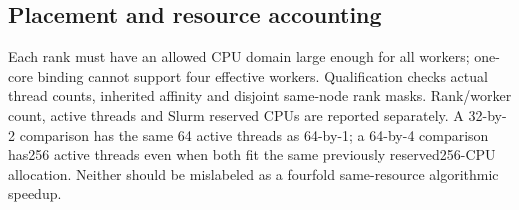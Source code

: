 \subsection{Placement and resource accounting}
Each rank must have an allowed CPU domain large enough for all workers;
one-core binding cannot support four effective workers. Qualification
checks actual thread counts, inherited affinity and disjoint same-node
rank masks. Rank/worker count, active threads and Slurm reserved CPUs are
reported separately. A 32-by-2 comparison has the same 64 active threads as
64-by-1; a 64-by-4 comparison has256 active threads even when both fit the
same previously reserved256-CPU allocation. Neither should be mislabeled
as a fourfold same-resource algorithmic speedup.
